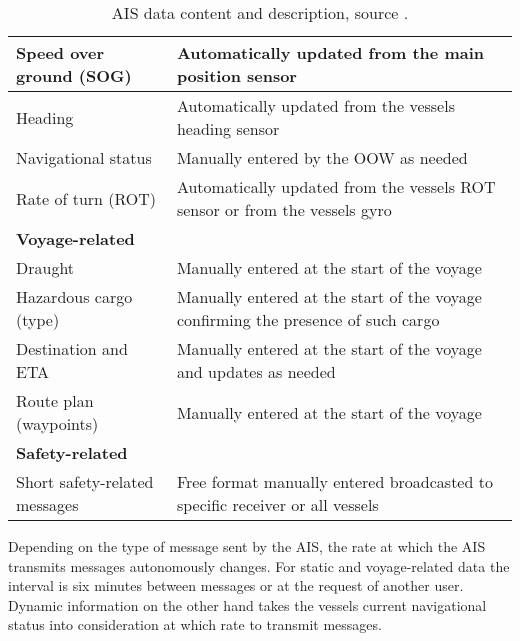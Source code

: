 \documentclass[../main.tex]{subfiles}
\begin{document}
\begin{table}[H]
\begin{tabular}{|m{5cm}|m{9cm}|}
Speed over ground (SOG)                                      & Automatically updated from the main position sensor                               \\ \hline
Heading                                                      & Automatically updated from the vessels heading sensor                             \\ \hline
Navigational status                                          & Manually entered by the OOW as needed                                             \\ \hline
Rate of turn (ROT)                                           & Automatically updated from the vessels ROT sensor or from the vessels gyro        \\ \hline
\rowcolor[HTML]{C0C0C0} 
\textbf{Voyage-related}                                      &                                                                                   \\ \hline
Draught                                                      & Manually entered at the start of the voyage                                       \\ \hline
Hazardous cargo (type)                                       & Manually entered at the start of the voyage confirming the presence of such cargo \\ \hline
Destination and ETA                                          & Manually entered at the start of the voyage and updates as needed                 \\ \hline
Route plan (waypoints)                                       & Manually entered at the start of the voyage                                       \\ \hline
\rowcolor[HTML]{C0C0C0} 
\textbf{Safety-related}                                      &                                                                                   \\ \hline
Short safety-related messages                                & Free format manually entered broadcasted to specific receiver or all vessels      \\ \hline
\end{tabular}
\caption{AIS data content and description, source \cite{IMO_2015}.}
\label{tab:ais-data}
\end{table}

Depending on the type of message sent by the AIS, the rate at which the AIS transmits messages autonomously changes. For static and voyage-related data the interval is six minutes between messages or at the request of another user. Dynamic information on the other hand takes the vessels current navigational status into consideration at which rate to transmit messages.
\end{document}
